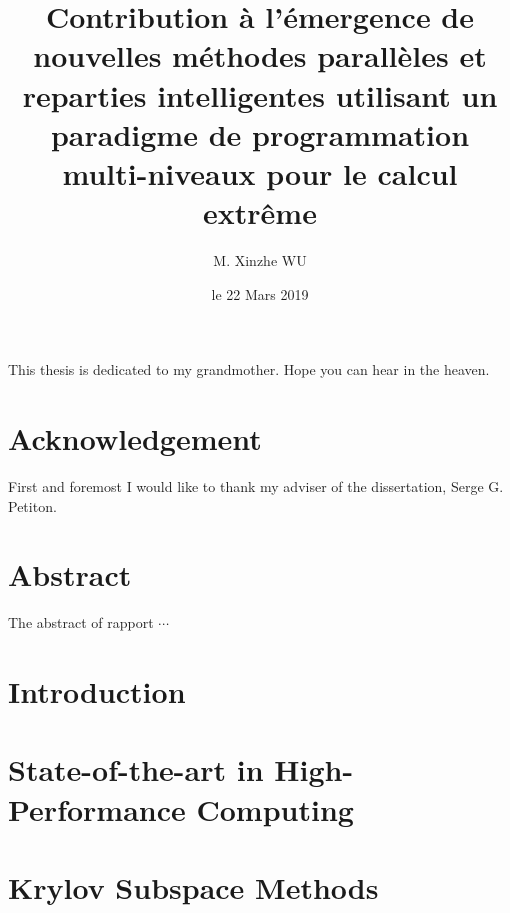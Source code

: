\documentclass{xinzhewu}
\title{\large \textrm{Contribution \`a l’\'emergence de nouvelles m\'ethodes parall\`eles et reparties intelligentes utilisant un paradigme de programmation multi-niveaux pour le calcul extr\^eme}}
\author{M. Xinzhe WU}
\date{le 22 Mars 2019}
\newenvironment{dedication}
{\clearpage           %
	\thispagestyle{empty}%
	\vspace*{\stretch{1}}%
	\itshape             %
	\raggedleft          %
}
{\par %
	\vspace{\stretch{3}} %
	\clearpage           %
}
\begin{document}
\maketitle
 
\clearemptydoublepage
\begin{dedication}
	This thesis is dedicated to my grandmother. Hope you can hear in the heaven.
\end{dedication}

\clearemptydoublepage

\chapter*{Acknowledgement}
\thispagestyle{empty}
First and foremost I would like to thank my adviser of the dissertation, Serge G. Petiton.

\clearemptydoublepage
\chapter*{Abstract}
\thispagestyle{empty}
The abstract of rapport $\cdots$

\clearemptydoublepage


\clearemptydoublepage

\frontmatter

{\small \tableofcontents}

{\small
\listoffigures
{}
}

{\small
\listoftables
{}
}

\mainmatter %

\chapter{Introduction}



\chapter{State-of-the-art in High-Performance Computing} \label{State-of-the-art in High-Performance Computing}



\chapter{Krylov Subspace Methods}\label{Krylov Subspace Methods}
\end{document}

